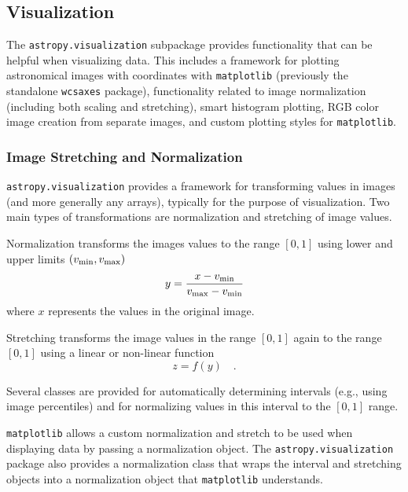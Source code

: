 \documentclass[modern]{aastex61}
\newcommand{\package}[1]{\texttt{#1}\xspace}
\begin{document}
\subsection{Visualization}

The \package{astropy.visualization} subpackage provides functionality that can be helpful when visualizing data. This includes a framework for plotting astronomical images with coordinates with \package{matplotlib} (previously the standalone \package{wcsaxes} package), functionality related to image normalization (including both scaling and stretching), smart histogram plotting, RGB color image creation from separate images, and custom plotting styles for \package{matplotlib}.

\subsubsection{Image Stretching and Normalization}

\label{sec:stretch}

\package{astropy.visualization} provides a framework for transforming values in images (and more generally any arrays), typically for the purpose of visualization. Two main types of transformations are normalization and stretching of image values.

Normalization transforms the images values to the range $[0,1]$ using lower and upper limits $(v_{\rm min}, v_{\rm max})$
\begin{equation}
y = \frac{x - v_{\rm min}}{v_{\rm max} - v_{\rm min}}
\end{equation}
where $x$ represents the values in the original image.

Stretching transforms the image values in the range $[0,1]$ again to the range $[0,1]$ using a linear or non-linear function
\begin{equation}
z = f(y) \quad .
\end{equation}

Several classes are provided for automatically determining intervals (e.g., using image percentiles) and for normalizing values in this interval to the $[0,1]$ range.

\package{matplotlib} allows a custom normalization and stretch to be used when displaying data by passing a normalization object. The \package{astropy.visualization} package also provides a normalization class that wraps the interval and stretching objects into a normalization object that \package{matplotlib} understands.
\end{document}
